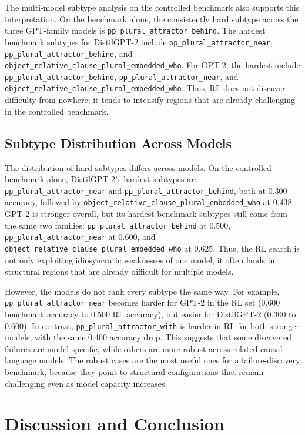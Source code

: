 \documentclass[11pt]{article}
\begin{document}
The multi-model subtype analysis on the controlled benchmark also supports
this interpretation. On the benchmark alone, the consistently hard subtype
across the three GPT-family models is
\texttt{pp\_plural\_attractor\_behind}. The hardest benchmark subtypes for
DistilGPT-2 include \texttt{pp\_plural\_attractor\_near},
\texttt{pp\_plural\_attractor\_behind}, and
\texttt{object\_relative\_clause\_plural\_embedded\_who}. For GPT-2, the
hardest include \texttt{pp\_plural\_attractor\_behind},
\texttt{pp\_plural\_attractor\_near}, and
\texttt{object\_relative\_clause\_plural\_embedded\_who}. Thus, RL does not
discover difficulty from nowhere; it tends to intensify regions that are already
challenging in the controlled benchmark.

\subsection{Subtype Distribution Across Models}

The distribution of hard subtypes differs across models. On the controlled
benchmark alone, DistilGPT-2's hardest subtypes are
\texttt{pp\_plural\_attractor\_near} and
\texttt{pp\_plural\_attractor\_behind}, both at 0.300 accuracy, followed by
\texttt{object\_relative\_clause\_plural\_embedded\_who} at 0.438. GPT-2 is
stronger overall, but its hardest benchmark subtypes still come from the same
two families: \texttt{pp\_plural\_attractor\_behind} at 0.500,
\texttt{pp\_plural\_attractor\_near} at 0.600, and
\texttt{object\_relative\_clause\_plural\_embedded\_who} at 0.625. Thus, the
RL search is not only exploiting idiosyncratic weaknesses of one model; it
often lands in structural regions that are already difficult for multiple
models.

However, the models do not rank every subtype the same way. For example,
\texttt{pp\_plural\_attractor\_near} becomes harder for GPT-2 in the RL set
(0.600 benchmark accuracy to 0.500 RL accuracy), but easier for DistilGPT-2
(0.300 to 0.600). In contrast, \texttt{pp\_plural\_attractor\_with} is harder
in RL for both stronger models, with the same 0.400 accuracy drop. This
suggests that some discovered failures are model-specific, while others are
more robust across related causal language models. The robust cases are the
most useful ones for a failure-discovery benchmark, because they point to
structural configurations that remain challenging even as model capacity
increases.

\section{Discussion and Conclusion}
\end{document}

